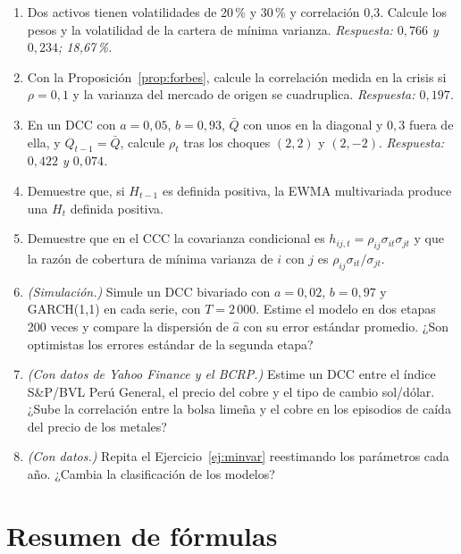 \begin{enumerate}[label=\textbf{\thechapter.\arabic*},leftmargin=*,itemsep=6pt]
  \item Dos activos tienen volatilidades de 20\,\% y 30\,\% y correlación 0,3. Calcule los pesos y la volatilidad de la
  cartera de mínima varianza. \textit{Respuesta: $0{,}766$ y $0{,}234$; 18,67\,\%.}

  \item Con la Proposición~\ref{prop:forbes}, calcule la correlación medida en la crisis si $\rho=0{,}1$ y la
  varianza del mercado de origen se cuadruplica. \textit{Respuesta: $0{,}197$.}

  \item En un DCC con $a=0{,}05$, $b=0{,}93$, $\bar Q$ con unos en la diagonal y $0{,}3$ fuera de ella, y
  $Q_{t-1}=\bar Q$, calcule $\rho_t$ tras los choques $(2,2)$ y $(2,-2)$. \textit{Respuesta: $0{,}422$ y $0{,}074$.}

  \item Demuestre que, si $H_{t-1}$ es definida positiva, la EWMA multivariada produce una $H_t$ definida positiva.

  \item Demuestre que en el CCC la covarianza condicional es $h_{ij,t}=\rho_{ij}\sigma_{it}\sigma_{jt}$ y que la
  razón de cobertura de mínima varianza de $i$ con $j$ es $\rho_{ij}\sigma_{it}/\sigma_{jt}$.

  \item \emph{(Simulación.)} Simule un DCC bivariado con $a=0{,}02$, $b=0{,}97$ y GARCH(1,1) en cada serie, con
  $T=2\,000$. Estime el modelo en dos etapas 200 veces y compare la dispersión de $\hat a$ con su error estándar
  promedio. ¿Son optimistas los errores estándar de la segunda etapa?

  \item \emph{(Con datos de Yahoo Finance y el BCRP.)} Estime un DCC entre el índice S\&P/BVL Perú General, el
  precio del cobre y el tipo de cambio sol/dólar. ¿Sube la correlación entre la bolsa limeña y el cobre en los
  episodios de caída del precio de los metales?

  \item \emph{(Con datos.)} Repita el Ejercicio~\ref{ej:minvar} reestimando los parámetros cada año. ¿Cambia la
  clasificación de los modelos?
\end{enumerate}

\section{Resumen de fórmulas}

